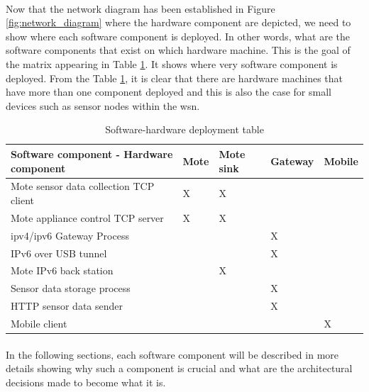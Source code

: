 \documentclass[12pt,a4paper,final]{report}
\begin{document}
\paragraph{}
Now that the network diagram has been established in Figure \ref{fig:network_diagram} where the hardware component are depicted, we need to show where each software component is deployed. In other words, what are the software components that exist on which hardware machine. This is the goal of the matrix appearing in Table \ref{table:soft_hard_deployment}. It shows where very software component is deployed. From the Table \ref{table:soft_hard_deployment}, it is clear that there are hardware machines that have more than one component deployed and this is also the case for small devices such as sensor nodes within the \gls{wsn}.

\begin{table}
    \begin{tabular}{lllll}
    		  \hline
    Software component - Hardware component & Mote & Mote sink & Gateway & Mobile \\ \hline
    Mote sensor data collection TCP client  & X    & X         & ~       & ~      \\ 
    Mote appliance control TCP server       & X    & X         & ~       & ~      \\
    \gls{ipv4}/\gls{ipv6} Gateway Process   & ~    & ~         & X       & ~      \\
    IPv6 over USB tunnel                    & ~    & ~         & X       & ~      \\
    Mote IPv6 back station                   & ~    & X         & ~       & ~      \\
    Sensor data storage process             & ~    & ~         & X       & ~      \\
    HTTP sensor data sender                 & ~    & ~         & X       & ~      \\
    Mobile client                           & ~    & ~         & ~       & X      \\
    \end{tabular}
    \caption{Software-hardware deployment table}
    \label{table:soft_hard_deployment}
\end{table}

\paragraph{}
In the following sections, each software component will be described in more details showing why such a component is crucial and what are the architectural decisions made to become what it is.
\end{document}
